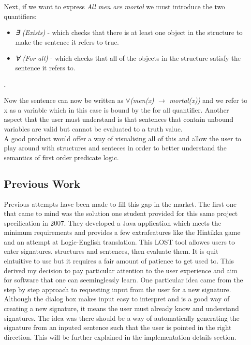 \documentclass{article}
\begin{document}
\noindent Next, if we want to express \emph{All men are mortal} we must introduce the two quantifiers:

	\begin{itemize}
	\item \emph{∃ (Exists)} - which checks that there is at least one object in the structure to make the sentence it refers to true.
	\item \emph{∀ (For all)} - which checks that all of the objects in the structure satisfy the sentence it refers to.
	\end{itemize}.

\noindent Now the sentence can now be written as \emph{$\forall$(men(x) $\rightarrow$ mortal(x))} and we refer to x as a variable which in this case is bound by the for all quantifier. Another aspect that the user must understand is that sentences that contain unbound variables are valid but cannot be evaluated to a truth value.\\

\noindent A good product would offer a way of visualising all of this and allow the user to play around with structures and senteces in order to better understand the semantics of first order predicate logic.

\subsection{Previous Work}
Previous attempts have been made to fill this gap in the market. The first one that came to mind was the solution one student provided for this same project specification in 2007. They developed a Java application which meets the minimum requirements and provides a few extrafeatures like the Hintikka game and an attempt at Logic-English translation. This LOST tool allowes users to enter signatures, structures and sentences, then evaluate them. It is quit eintuitive to use but it requires a fair amount of patience to get used to. This derived my decision to pay particular attention to the user experience and aim for software that one can seeminglessly learn. One particular idea came from the step by step approach to requesting input from the user for a new signature. Although the dialog box makes input easy to interpret and is a good way of creating a new signature, it means the user must already know and understand signatures. The idea was there should be a way of automatically generating the signature from an inputed sentence such that the user is pointed in the right direction. This will be further explained in the implementation details section.\\
\end{document}
